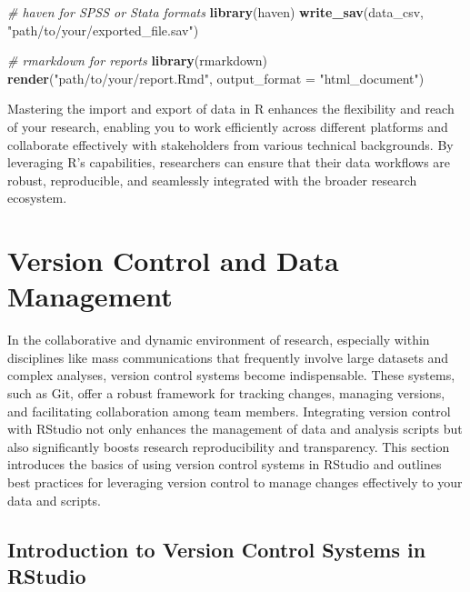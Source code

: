\documentclass[
]{book}
\newenvironment{Shaded}{\begin{snugshade}}{\end{snugshade}}
\newcommand{\AttributeTok}[1]{\textcolor[rgb]{0.13,0.29,0.53}{#1}}
\newcommand{\CommentTok}[1]{\textcolor[rgb]{0.56,0.35,0.01}{\textit{#1}}}
\newcommand{\FunctionTok}[1]{\textcolor[rgb]{0.13,0.29,0.53}{\textbf{#1}}}
\newcommand{\NormalTok}[1]{#1}
\newcommand{\StringTok}[1]{\textcolor[rgb]{0.31,0.60,0.02}{#1}}
\begin{document}
\begin{Shaded}
\begin{Highlighting}[]
\CommentTok{\# haven for SPSS or Stata formats}
\FunctionTok{library}\NormalTok{(haven)}
\FunctionTok{write\_sav}\NormalTok{(data\_csv, }\StringTok{"path/to/your/exported\_file.sav"}\NormalTok{)}

\CommentTok{\# rmarkdown for reports}
\FunctionTok{library}\NormalTok{(rmarkdown)}
\FunctionTok{render}\NormalTok{(}\StringTok{"path/to/your/report.Rmd"}\NormalTok{, }\AttributeTok{output\_format =} \StringTok{"html\_document"}\NormalTok{)}
\end{Highlighting}
\end{Shaded}

Mastering the import and export of data in R enhances the flexibility and reach of your research, enabling you to work efficiently across different platforms and collaborate effectively with stakeholders from various technical backgrounds. By leveraging R's capabilities, researchers can ensure that their data workflows are robust, reproducible, and seamlessly integrated with the broader research ecosystem.

\hypertarget{version-control-and-data-management}{%
\section{Version Control and Data Management}\label{version-control-and-data-management}}

In the collaborative and dynamic environment of research, especially within disciplines like mass communications that frequently involve large datasets and complex analyses, version control systems become indispensable. These systems, such as Git, offer a robust framework for tracking changes, managing versions, and facilitating collaboration among team members. Integrating version control with RStudio not only enhances the management of data and analysis scripts but also significantly boosts research reproducibility and transparency. This section introduces the basics of using version control systems in RStudio and outlines best practices for leveraging version control to manage changes effectively to your data and scripts.

\hypertarget{introduction-to-version-control-systems-in-rstudio}{%
\subsection*{Introduction to Version Control Systems in RStudio}\label{introduction-to-version-control-systems-in-rstudio}}
\end{document}
